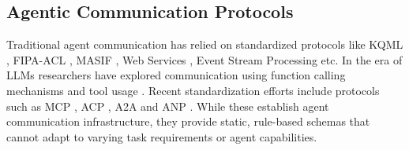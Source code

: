 \subsection{Agentic Communication Protocols}
Traditional agent communication has relied on standardized protocols like KQML \cite{finin1994kqml}, FIPA-ACL \cite{fipa1997acl}, MASIF \cite{milojicic1999masif}, Web Services \cite{berners2001web}, Event Stream Processing \cite{cugola2012processing} etc.
In the era of LLMs researchers have explored communication using function calling mechanisms \cite{schick2023toolformer} and tool usage \cite{schick2023toolformer}.
Recent standardization efforts include protocols such as MCP \cite{anthropic2024mcp}, ACP \cite{acp2024protocol}, A2A \cite{a2a2024protocol} and ANP \cite{anp2024protocol}. While these establish agent communication infrastructure, they provide static, rule-based schemas that cannot adapt to varying task requirements or agent capabilities.

